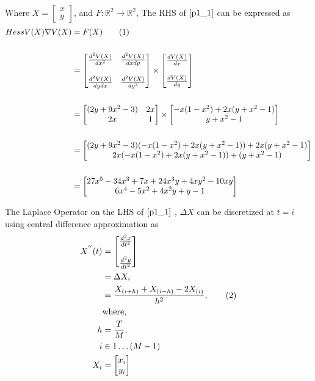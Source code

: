 \documentclass[twoside,12pt]{article}
\newcommand\numberthis{\addtocounter{equation}{1}\tag{\theequation}}
\begin{document}
Where $X= \begin{bmatrix}x\\y\end{bmatrix}$, and $F\colon \mathbb{R}^2\to\mathbb{R}^2$, The RHS of $\eqref{p1_1}$ can be expressed as
\begin{align*}
HessV(X) \nabla V(X)
  &= F(X)\numberthis\label{p1_2}\\\\
  &= \begin{bmatrix}
\frac{d^2 V(X)}{dx^2} & \frac{d^2 V(X)}{dx dy}\\\\
\frac{d^2 V(X)}{dy dx}& \frac{d^2V(X)}{dy^2}
\end{bmatrix} \times \begin{bmatrix}
\frac{dV(X)}{dx}\\\\\frac{dV(X)}{dy}
\end{bmatrix}  \\
\\
 &= \begin{bmatrix}
 (2y+9x^2-3)&2x\\
 2x&1
 \end{bmatrix} \times \begin{bmatrix}
 -x(1-x^2)+2x(y+x^2-1)\\
 y+x^2-1
 \end{bmatrix}  \\
\\
&=  \begin{bmatrix}
 (2y+9x^2-3)(-x(1-x^2)+2x(y+x^2-1))+2x(y+x^2-1)\\
 2x(-x(1-x^2)+2x(y+x^2-1))+(y+x^2-1)
 \end{bmatrix}\\
 \\
 &=  \begin{bmatrix}
  27x^5-34x^3+7x+24x^3y+4xy^2-10xy\\
  6x^4-5x^2+4x^2y+y-1
  \end{bmatrix}
 \end{align*}

 The Laplace Operator on the LHS of $\eqref{p1_1}$ , $\Delta X$ can be discretized at $t = i$ using central difference approximation as
 \begin{align*}
X^{''}(t) &= \begin{bmatrix}
 \frac{d^2x}{dt^2}\\\\
 \frac{d^2y}{dt^2}
 \end{bmatrix} \\ &=  \Delta X_{i} \\
 &=  \frac{X_{(i+h)}+X_{(i-h)}-2X_{(i)}}{h^2}, \numberthis\label{p1_3}\\
 &\text{where,}\\
 h &= \frac{T}{M},\\
 i &\in 1\dots(M-1)\\
 X_i&= \begin{bmatrix}x_i\\y_i\end{bmatrix}
 \end{align*}
\end{document}
